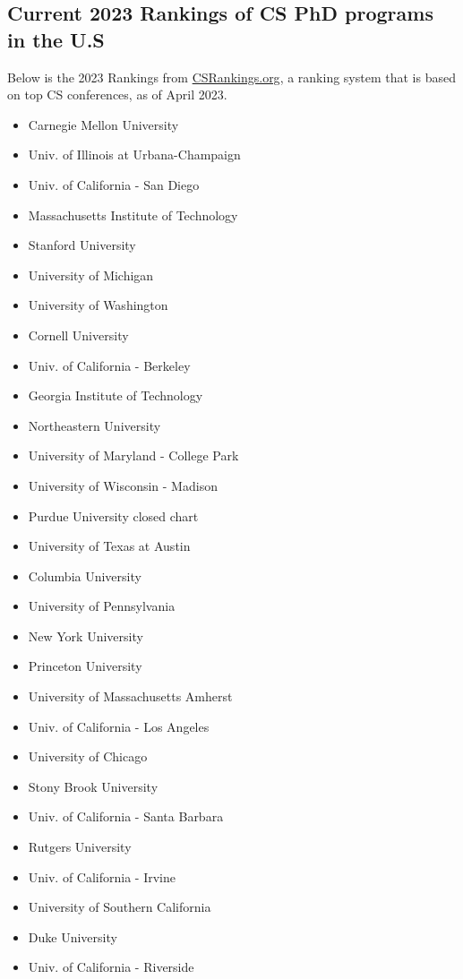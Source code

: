 \documentclass[10pt]{article}
\begin{document}
\subsection{Current 2023 Rankings of CS PhD programs in the U.S}
  Below is the 2023 Rankings from \href{https://www.csrankings.org}{CSRankings.org}, a ranking system that is based on top CS conferences, as of April 2023.
  
\begin{itemize}
\item Carnegie Mellon University 
\item Univ. of Illinois at Urbana-Champaign 
\item Univ. of California - San Diego  
\item Massachusetts Institute of Technology 
\item Stanford University         
\item University of Michigan  
\item University of Washington 
\item Cornell University  
\item Univ. of California - Berkeley  
\item Georgia Institute of Technology 
\item Northeastern University  
\item University of Maryland - College Park 
\item University of Wisconsin - Madison  
\item Purdue University  closed chart
\item University of Texas at Austin  
\item Columbia University  
\item University of Pennsylvania 
\item New York University  
\item Princeton University 
\item University of Massachusetts Amherst  
\item Univ. of California - Los Angeles
\item University of Chicago 
\item Stony Brook University
\item Univ. of California - Santa Barbara 
\item Rutgers University  
\item Univ. of California - Irvine 
\item University of Southern California 
\item Duke University 
\item Univ. of California - Riverside

\end{itemize}
\end{document}
